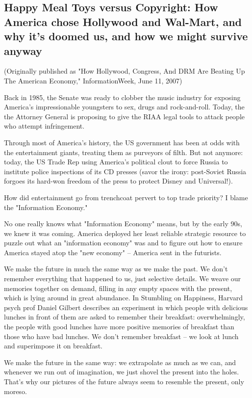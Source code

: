\subsection{Happy Meal Toys versus Copyright: How America chose Hollywood and Wal-Mart, and why it's doomed us, and how we might survive anyway}

(Originally published as "How Hollywood, Congress, And DRM Are
Beating Up The American Economy," InformationWeek, June 11, 2007)

Back in 1985, the Senate was ready to clobber the music industry
for exposing America's impressionable youngsters to sex, drugs and
rock-and-roll. Today, the the Attorney General is proposing to give
the RIAA legal tools to attack people who attempt infringement.

Through most of America's history, the US government has been at
odds with the entertainment giants, treating them as purveyors of
filth. But not anymore: today, the US Trade Rep using America's
political clout to force Russia to institute police inspections of
its CD presses (savor the irony: post-Soviet Russia forgoes its
hard-won freedom of the press to protect Disney and Universal!).

How did entertainment go from trenchcoat pervert to top trade
priority? I blame the "Information Economy."

No one really knows what "Information Economy" means, but by the
early 90s, we knew it was coming. America deployed her least
reliable strategic resource to puzzle out what an "information
economy" was and to figure out how to ensure America stayed atop
the "new economy" -- America sent in the futurists.

We make the future in much the same way as we make the past. We
don't remember everything that happened to us, just selective
details. We weave our memories together on demand, filling in any
empty spaces with the present, which is lying around in great
abundance. In Stumbling on Happiness, Harvard psych prof Daniel
Gilbert describes an experiment in which people with delicious
lunches in front of them are asked to remember their breakfast:
overwhelmingly, the people with good lunches have more positive
memories of breakfast than those who have bad lunches. We don't
remember breakfast -- we look at lunch and superimpose it on
breakfast.

We make the future in the same way: we extrapolate as much as we
can, and whenever we run out of imagination, we just shovel the
present into the holes. That's why our pictures of the future
always seem to resemble the present, only moreso.

